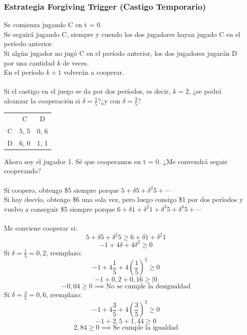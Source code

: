 \documentclass{article}
\begin{document}
        \subsubsection*{Estrategia Forgiving Trigger (Castigo Temporario)}
            Se comienza jugando C en t = 0. \\
            Se seguirá jugando C, siempre y cuendo los dos jugadores hayan jugado C en el período anterior. \\
            Si algún jugador no jugó C en el período anterior, los dos jugadores jugarán D por una cantidad $k$ de veces. \\
            En el período $k+1$ volverán a cooperar. \\
            \\
            Si el castigo en el juego se da por dos períodos, es decir, $k = 2$, ¿se podrá alcanzar la cooperación si $\delta = \frac{1}{5}$?¿y con $\delta = \frac{3}{5}$?
            \begin{table}[H]
                \centering
                    \begin{tabular}{|c|c|c|}
                          & C    & D    \\
                        C & 5, 5 & 0, 6 \\
                        D & 6, 0 & 1, 1 \\
                    \end{tabular}            
            \end{table}
            Ahora soy el jugador 1. Sé que cooperamos en t = 0. ¿Me convendrá seguir cooperando? \\
            \\
            Si coopero, obtengo \$5 siempre porque \(5 + \delta 5 + \delta^{2}5 + \cdots\) \\
            Si hay desvío, obtengo \$6 una sola vez, pero luego consigo \$1 por dos períodos y vuelvo a conseguir \$5 siempre porque \(6 + \delta 1 + \delta^{2}1 + \delta^{3}5 + \delta^{4}5 + \cdots\) \\
            \\
            Me conviene cooperar si:
            \[5+ \delta 5 + \delta^{2}5 \geq 6 + \delta 1 + \delta^{2}1\]
            \[-1 + 4 \delta + 4 \delta^{2} \geq 0\]
            Si \(\delta = \frac{1}{5} = 0,2\), reemplazo:
            \[-1+4\frac{1}{5}+4(\frac{1}{5})^{2} \geq 0\]
            \[-1+0,2+0,16 \geq| 0\]
            \[-0,04 \geq 0 \implies \text{No se cumple la desigualdad}\]
            Si \(\delta = \frac{3}{5} = 0,6\), reemplazo:
            \[-1+4\frac{3}{5}+4(\frac{3}{5})^{2} \geq 0\]
            \[-1+2,5+1,44 \geq 0\]
            \[2,84 \geq 0 \implies \text{Se cumple la igualdad}\]
            
\end{document}
